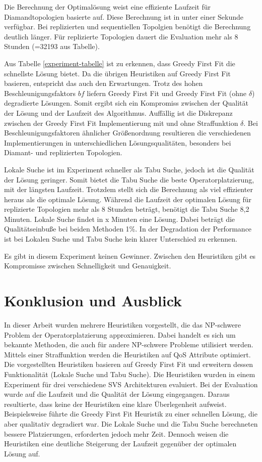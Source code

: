 \documentclass{article}
\begin{document}
Die Berechnung der Optimalösung weist eine effiziente Laufzeit für Diamandtopologien basierte auf. 
Diese Berechnung ist in unter einer Sekunde verfügbar. Bei replizierten und sequentiellen Topolgien benötigt die Berechnung deutlich länger. 
Für replizierte Topologien dauert die Evaluation mehr als 8 Stunden (=32193 aus Tabelle).

Aus Tabelle \ref{experiment-tabelle} ist zu erkennen, dass Greedy First Fit die schnellste Lösung bietet. 
Da die übrigen Heuristiken auf Greedy First Fit basieren, entspricht das auch den Erwartungen. 
Trotz des hohen Beschleunigungsfaktors $bf$ liefern Greedy First Fit und Greedy First Fit (ohne $\delta$) degradierte Lösungen. 
Somit ergibt sich ein Kompromiss zwischen der Qualität der Lösung und der Laufzeit des Algorithmus. 
Auffällig ist die Diskrepanz zwischen der Greedy First Fit Implementierung mit und ohne Straffunktion $\delta$. 
Bei Beschleunigungsfaktoren ähnlicher Größenordnung resultieren die verschiedenen Implementierungen 
in unterschiedlichen Lösungsqualitäten, besonders bei Diamant- und replizierten Topologien.

Lokale Suche ist im Experiment schneller als Tabu Suche, jedoch ist die Qualität der Lösung geringer. 
Somit bietet die Tabu Suche die beste Operatorplatzierung, mit der längsten Laufzeit. 
Trotzdem stellt sich die Berechnung als viel effizienter heraus als die optimale Lösung. 
Während die Laufzeit der optimalen Lösung für replizierte Topologien mehr als 8 Stunden beträgt, benötigt die Tabu Suche 8,2 Minuten. 
Lokale Suche findet in x Minuten eine Lösung. Dabei beträgt die Qualitätseinbuße bei beiden Methoden 1\%. 
In der Degradation der Performance ist bei Lokalen Suche und Tabu Suche kein klarer Unterschied zu erkennen. 

Es gibt in diesem Experiment keinen Gewinner. Zwischen den Heuristiken gibt es Kompromisse zwischen Schnelligkeit und Genauigkeit. 

\section{Konklusion und Ausblick}
In dieser Arbeit wurden mehrere Heuristiken vorgestellt, die das NP-schwere Problem der Operatorplatzierung approximieren. 
Dabei handelt es sich um bekannte Methoden, die auch für andere NP-schwere Probleme utilisiert werden. Mittels einer Straffunktion
werden die Heuristiken auf QoS Attribute optimiert. \\
Die vorgestellten Heuristiken basieren auf Greedy First Fit und erweitern dessen Funktionalität (Lokale Suche und Tabu Suche).
Die Heuristiken wurden in einem Experiment für drei verschiedene SVS Architekturen evaluiert. 
Bei der Evaluation wurde auf die Laufzeit und die Qualität der Lösung eingegangen. 
Daraus resultierte, dass keine der Heuristiken eine klare Überlegenheit aufweist. 
Beispielsweise führte die Greedy First Fit Heuristik zu einer schnellen Lösung, die aber qualitativ degradiert war.
Die Lokale Suche und die Tabu Suche berechneten bessere Platzierungen, erforderten jedoch mehr Zeit.
Dennoch weisen die Heuristiken eine deutliche Steigerung der Laufzeit gegenüber der optimalen Lösung auf. 
\\
\end{document}
